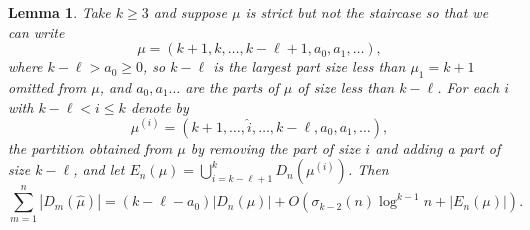 \documentclass{article}
\theoremstyle{plain}
\newtheorem{lemma}[theorem]{Lemma}
\theoremstyle{definition}
\begin{document}
\begin{lemma}\label{lem:decomp a>0} Take $k\geq 3$ and suppose $\mu$ is strict but not the staircase so that we can write  
$$\mu = (k+1,k,\ldots, k-\ell+1, a_0, a_1,\ldots),$$
where $k-\ell> a_0 \geq 0$, so $k-\ell$ is the largest part size less than $\mu_1=k+1$ omitted from $\mu$, and $a_0,a_1 \ldots$ are the parts of $\mu$ of size less than $k-\ell$. For each $i$ with $ k - \ell < i \leq k$ denote by 
$$\mu^{(i)} = (k+1, \ldots, \widehat i,\ldots, k-\ell, a_0, a_1,\ldots),$$ 
the partition obtained from $\mu$ by removing the part of size $i$ and adding a part of size $k-\ell$, and let ${E_n(\mu) = \bigcup_{i = k - \ell+1}^k D_n(\mu^{(i)})}$. Then $$\sum_{m=1}^{n} |D_{m}(\hat\mu)| = (k-\ell-a_0)|D_n(\mu)| + 
    O\left(\sigma_{k-2}(n)\log^{k-1} n +\left|E_n(\mu)\right| \right).$$
\end{lemma}
\end{document}
